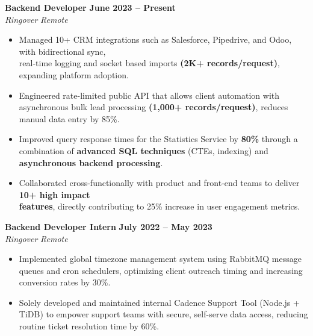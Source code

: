 \documentclass[a4paper,12pt]{article}
\newenvironment{experience}[4]
{%
    \noindent\textbf{#1} \hfill \textbf{#2} \\
    \textit{#3} \hfill \textit{#4} 
    \begin{itemize}[nosep, leftmargin=1.2em, itemsep=1pt, label=$\bullet$]
}
{%
    \end{itemize}
}
\begin{document}
\begin{experience}
 {Backend Developer}                        %
  {June 2023 -- Present}                    %
  {Ringover}                               %
  {Remote}                                 %
    \item Managed 10+ CRM integrations such as Salesforce, Pipedrive, and Odoo, with bidirectional sync,\\real-time logging and socket based imports \textbf{(2K+ records/request)}, expanding platform adoption.
    \item Engineered rate-limited public API that allows client automation with asynchronous bulk lead processing \textbf{(1,000+ records/request)}, reduces manual data entry by 85\%.  
    \item Improved query response times for the Statistics Service by \textbf{80\%} through a combination of \textbf{advanced SQL techniques} (CTEs, indexing) and \textbf{asynchronous backend processing}.
    \item Collaborated cross-functionally with product and front-end teams to deliver \textbf{10+ high impact\\features}, directly contributing to 25\% increase in user engagement metrics.
\end{experience}

\begin{experience}
  {Backend Developer Intern}               %
  {July 2022 -- May 2023}                  %
  {Ringover}                               %
  {Remote}                                 %
    \item Implemented global timezone management system using RabbitMQ message queues and cron schedulers, optimizing client outreach timing and increasing conversion rates by 30\%.
    \item Solely developed and maintained internal Cadence Support Tool (Node.js + TiDB) to empower support teams with secure, self-serve data access, reducing routine ticket resolution time by 60\%. 
\end{experience}
\end{document}
